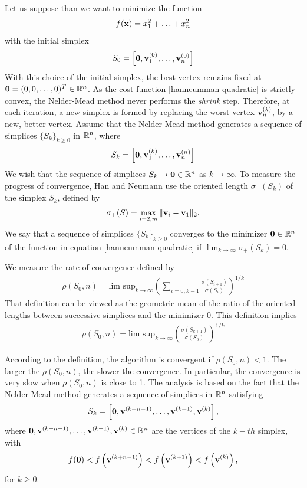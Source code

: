 Let us suppose than we want to minimize the function 
\begin{eqnarray}
\label{hanneumman-quadratic}
f(\mathbf{x}) = x_1^2+\ldots+x_n^2
\end{eqnarray}
with the initial simplex 
\begin{eqnarray}
S_0 = \left[\bold{0},\mathbf{v}^{(0)}_1,\ldots,\mathbf{v}^{(0)}_n\right]
\end{eqnarray}
With this choice of the initial simplex, the best vertex remains fixed 
at $\bold{0}=(0,0,\ldots,0)^T\in\mathbb{R}^n$. As the cost function \ref{hanneumman-quadratic}
is strictly convex, the Nelder-Mead method never performs
the \emph{shrink} step. Therefore, at each iteration, a new simplex 
is formed by replacing the worst vertex $\mathbf{v}^{(k)}_n$, by a 
new, better vertex. Assume that the Nelder-Mead method 
generates a sequence of simplices $\{S_k\}_{k\geq 0}$ in $\mathbb{R}^n$,
where 
\begin{eqnarray}
S_k = \left[\bold{0},\mathbf{v}^{(k)}_1,\ldots,\mathbf{v}^{(n)}_n\right]
\end{eqnarray}
We wish that the sequence of simplices $S_k\rightarrow \bold{0}\in\mathbb{R}^n$
as $k\rightarrow \infty$. To measure the progress of convergence,
Han and Neumann use the oriented length $\sigma_+(S_k)$ of the simplex $S_k$,
defined by 
\begin{eqnarray}
\sigma_+(S) = \max_{i=2,m} \|\mathbf{v}_i - \mathbf{v}_1\|_2.
\end{eqnarray}
We say that a sequence of simplices $\{S_k\}_{k\geq 0}$ converges to the minimizer $\bold{0}\in\mathbb{R}^n$
of the function in equation \ref{hanneumman-quadratic} if 
$\lim_{k\rightarrow \infty} \sigma_+(S_k) = 0$.

We measure the rate of convergence defined by 
\begin{eqnarray}
\label{rho-rate-convergence}
\rho(S_0,n) = \textrm{lim sup}_{k\rightarrow \infty} 
\left(\sum_{i=0,k-1} \frac{\sigma(S_{i+1})}{\sigma(S_i)}\right)^{1/k}
\end{eqnarray}
That definition can be viewed as the geometric mean of the ratio of the 
oriented lengths between successive simplices and the minimizer 0.
This definition implies 
\begin{eqnarray}
\label{rho-rate-convergence2}
\rho(S_0,n) = \textrm{lim sup}_{k\rightarrow \infty} 
\left( \frac{\sigma(S_{k+1})}{\sigma(S_0)}\right)^{1/k}
\end{eqnarray}

According to the definition, the algorithm is convergent if $\rho(S_0,n) < 1$.
The larger the $\rho(S_0,n)$, the slower the convergence. In particular, the convergence 
is very slow when $\rho(S_0,n)$ is close to 1. 
The analysis is based on the fact that the Nelder-Mead method generates a sequence of simplices
in $\mathbb{R}^n$ satisfying 
\begin{eqnarray}
S_k = \left[\bold{0},\mathbf{v}^{(k+n-1)},\ldots,\mathbf{v}^{(k+1)},\mathbf{v}^{(k)}\right],
\end{eqnarray}
where $\bold{0},\mathbf{v}^{(k+n-1)},\ldots,\mathbf{v}^{(k+1)},\mathbf{v}^{(k)}\in\mathbb{R}^n$ are the vertices
of the $k-th$ simplex, with
\begin{eqnarray}
f(\bold{0}) < f\left(\mathbf{v}^{(k+n-1)}\right) < f\left(\mathbf{v}^{(k+1)}\right) < f\left(\mathbf{v}^{(k)}\right),
\end{eqnarray}
for $k\geq 0$. 

